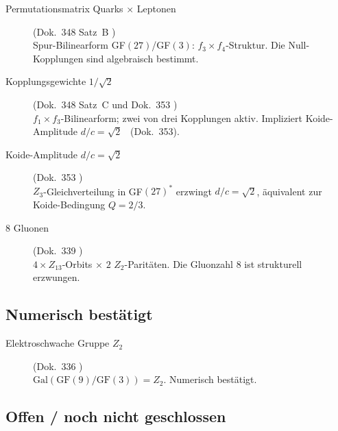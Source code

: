 \begin{description}
\item[Permutationsmatrix Quarks $\times$ Leptonen] (Dok.~348 Satz~B \BM)\\
Spur-Bilinearform GF$(27)$/GF$(3)$: $f_3 \times f_4$-Struktur.
Die Null-Kopplungen sind algebraisch bestimmt.

\item[Kopplungsgewichte $1/\sqrt{2}$] (Dok.~348 Satz~C und Dok.~353 \BM)\\
$f_1 \times f_3$-Bilinearform; zwei von drei Kopplungen aktiv.
Impliziert Koide-Amplitude $d/c = \sqrt{2}$ \BM\ (Dok.~353).

\item[Koide-Amplitude $d/c = \sqrt{2}$] (Dok.~353 \BM)\\
$Z_3$-Gleichverteilung in GF$(27)^*$ erzwingt $d/c = \sqrt{2}$,
äquivalent zur Koide-Bedingung $Q = 2/3$.

\item[8 Gluonen] (Dok.~339 \BM)\\
$4 \times Z_{13}$-Orbits $\times$ $2$ $Z_2$-Paritäten.
Die Gluonzahl 8 ist strukturell erzwungen.

\end{description}

\subsection*{Numerisch bestätigt \KM}

\begin{description}

\item[Elektroschwache Gruppe $Z_2$] (Dok.~336 \KM)\\
$\mathrm{Gal}(\mathrm{GF}(9)/\mathrm{GF}(3)) = Z_2$.
Numerisch bestätigt.

\end{description}

\subsection*{Offen / noch nicht geschlossen \SM}

